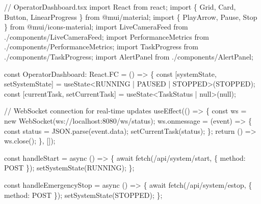 \documentclass[
]{article}
\newenvironment{Shaded}{\begin{snugshade}}{\end{snugshade}}
\newcommand{\NormalTok}[1]{#1}
\begin{document}
\begin{Shaded}
\begin{Highlighting}[]
\NormalTok{// OperatorDashboard.tsx}
\NormalTok{import React from \textquotesingle{}react\textquotesingle{};}
\NormalTok{import \{ Grid, Card, Button, LinearProgress \} from \textquotesingle{}@mui/material\textquotesingle{};}
\NormalTok{import \{ PlayArrow, Pause, Stop \} from \textquotesingle{}@mui/icons{-}material\textquotesingle{};}
\NormalTok{import LiveCameraFeed from \textquotesingle{}./components/LiveCameraFeed\textquotesingle{};}
\NormalTok{import PerformanceMetrics from \textquotesingle{}./components/PerformanceMetrics\textquotesingle{};}
\NormalTok{import TaskProgress from \textquotesingle{}./components/TaskProgress\textquotesingle{};}
\NormalTok{import AlertPanel from \textquotesingle{}./components/AlertPanel\textquotesingle{};}

\NormalTok{const OperatorDashboard: React.FC = () =\textgreater{} \{}
\NormalTok{  const [systemState, setSystemState] = useState\textless{}\textquotesingle{}RUNNING\textquotesingle{} | \textquotesingle{}PAUSED\textquotesingle{} | \textquotesingle{}STOPPED\textquotesingle{}\textgreater{}(\textquotesingle{}STOPPED\textquotesingle{});}
\NormalTok{  const [currentTask, setCurrentTask] = useState\textless{}TaskStatus | null\textgreater{}(null);}

\NormalTok{  // WebSocket connection for real{-}time updates}
\NormalTok{  useEffect(() =\textgreater{} \{}
\NormalTok{    const ws = new WebSocket(\textquotesingle{}ws://localhost:8080/ws/status\textquotesingle{});}
\NormalTok{    ws.onmessage = (event) =\textgreater{} \{}
\NormalTok{      const status = JSON.parse(event.data);}
\NormalTok{      setCurrentTask(status);}
\NormalTok{    \};}
\NormalTok{    return () =\textgreater{} ws.close();}
\NormalTok{  \}, []);}

\NormalTok{  const handleStart = async () =\textgreater{} \{}
\NormalTok{    await fetch(\textquotesingle{}/api/system/start\textquotesingle{}, \{ method: \textquotesingle{}POST\textquotesingle{} \});}
\NormalTok{    setSystemState(\textquotesingle{}RUNNING\textquotesingle{});}
\NormalTok{  \};}

\NormalTok{  const handleEmergencyStop = async () =\textgreater{} \{}
\NormalTok{    await fetch(\textquotesingle{}/api/system/estop\textquotesingle{}, \{ method: \textquotesingle{}POST\textquotesingle{} \});}
\NormalTok{    setSystemState(\textquotesingle{}STOPPED\textquotesingle{});}
\NormalTok{  \};}


\end{Highlighting}
\end{Shaded}
\end{document}
